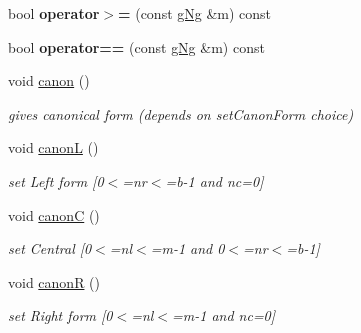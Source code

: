 \begin{DoxyCompactItemize}
bool {\bfseries operator$>$=} (const \mbox{\hyperlink{classetvo_i_i_1_1g_ng}{g\+Ng}} \&m) const
\item 
\mbox{\label{classetvo_i_i_1_1g_ng_a7393fa830f72d4911ab523c5b21f37c2}} 
bool {\bfseries operator==} (const \mbox{\hyperlink{classetvo_i_i_1_1g_ng}{g\+Ng}} \&m) const
\item 
\mbox{\label{classetvo_i_i_1_1g_ng_a78624342184c361ff14a4eb8215e5832}} 
void \mbox{\hyperlink{classetvo_i_i_1_1g_ng_a78624342184c361ff14a4eb8215e5832}{canon}} ()
\begin{DoxyCompactList}\small\item\em gives canonical form (depends on set\+Canon\+Form choice) \end{DoxyCompactList}\item 
\mbox{\label{classetvo_i_i_1_1g_ng_a0c8273bff466780729524d88173e4973}} 
void \mbox{\hyperlink{classetvo_i_i_1_1g_ng_a0c8273bff466780729524d88173e4973}{canonL}} ()
\begin{DoxyCompactList}\small\item\em set Left form \mbox{[}0$<$=nr$<$=b-\/1 and nc=0\mbox{]} \end{DoxyCompactList}\item 
\mbox{\label{classetvo_i_i_1_1g_ng_abff475fb0ca90af69ae983560b057e38}} 
void \mbox{\hyperlink{classetvo_i_i_1_1g_ng_abff475fb0ca90af69ae983560b057e38}{canonC}} ()
\begin{DoxyCompactList}\small\item\em set Central \mbox{[}0$<$=nl$<$=m-\/1 and 0$<$=nr$<$=b-\/1\mbox{]} \end{DoxyCompactList}\item 
\mbox{\label{classetvo_i_i_1_1g_ng_a236145cf430e6d4ac456517eebaa5965}} 
void \mbox{\hyperlink{classetvo_i_i_1_1g_ng_a236145cf430e6d4ac456517eebaa5965}{canonR}} ()
\begin{DoxyCompactList}\small\item\em set Right form \mbox{[}0$<$=nl$<$=m-\/1 and nc=0\mbox{]} \end{DoxyCompactList}\item 
\mbox{\label{classetvo_i_i_1_1g_ng_a9047025599a1b77ecaf1ec848c5d67d3}} 

\end{DoxyCompactItemize}
